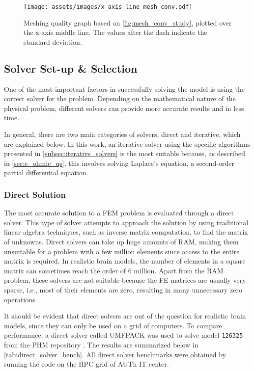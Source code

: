 \begin{figure}[H]
    \centering
    \texttt{[image: assets/images/x\_axis\_line\_mesh\_conv.pdf]}
    \caption{Meshing quality graph based on \autoref{fig:mesh_conv_study}, plotted over the x-axis middle line. The values after the dash indicate the standard deviation.}
    \label{fig:mesh_conv_graph}
\end{figure}

\subsection{Solver Set-up \& Selection}

One of the most important factors in successfully solving the model is using the correct solver for the problem. Depending on the mathematical nature of the physical problem, different solvers can provide more accurate results and in less time.

In general, there are two main categories of solvers, direct and iterative, which are explained below. In this work, an iterative solver using the specific algorithms presented in \ref{subsec:iterative_solvers} is the most suitable because, as described in \ref{sec:e_ohmic_qs}, this involves solving Laplace's equation, a second-order partial differential equation.

\subsubsection{Direct Solution}

The most accurate solution to a \gls{FEM} problem is evaluated through a direct solver. This type of solver attempts to approach the solution by using traditional linear algebra techniques, such as inverse matrix computation, to find the matrix of unknowns. Direct solvers can take up huge amounts of \gls{RAM}, making them unsuitable for a problem with a few million elements since access to the entire matrix is required. In realistic brain models, the number of elements in a square matrix can sometimes reach the order of 6 million. Apart from the \gls{RAM} problem, these solvers are not suitable because the \gls{FE} matrices are usually very sparse, i.e., most of their elements are zero, resulting in many unnecessary zero operations.

It should be evident that direct solvers are out of the question for realistic brain models, since they can only be used on a grid of computers. To compare performance, a direct solver called \gls{UMFPACK} \cite{Davis2004_umfpack} was used to solve model \texttt{126325} from the \gls{PHM} repository \cite{ErikG.Lee2016}. The results are summarized below in \autoref{tab:direct_solver_bench}. All direct solver benchmarks were obtained by running the code on the \gls{HPC} grid of \gls{AUTh} \gls{IT} center.

